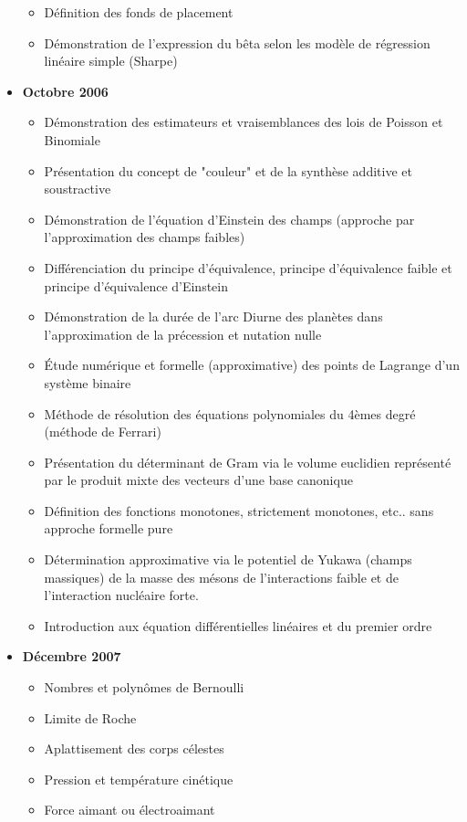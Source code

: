\begin{itemize}
\begin{itemize}[noitemsep]
				\item Définition des fonds de placement
				\item Démonstration de l'expression du bêta selon les modèle de régression linéaire simple (Sharpe)		
			\end{itemize}
		\item \textbf{Octobre 2006}
			\begin{itemize}[noitemsep]
				\item Démonstration des estimateurs et vraisemblances des lois de Poisson et Binomiale
				\item Présentation du concept de "couleur" et de la synthèse additive et soustractive
				\item Démonstration de l'équation d'Einstein des champs (approche par l'approximation des champs faibles)
				\item Différenciation du principe d'équivalence, principe d'équivalence faible et principe d'équivalence d'Einstein
				\item Démonstration de la durée de l'arc Diurne des planètes dans l'approximation de la précession et nutation nulle
				\item Étude numérique et formelle (approximative) des points de Lagrange d'un système binaire
				\item Méthode de résolution des équations polynomiales du 4èmes degré (méthode de Ferrari)
				\item Présentation du déterminant de Gram via le volume euclidien représenté par le produit mixte des vecteurs d'une base canonique
				\item Définition des fonctions monotones, strictement monotones, etc.. sans approche formelle pure
				\item Détermination approximative via le potentiel de Yukawa (champs massiques) de la masse des mésons de l'interactions faible et de l'interaction nucléaire forte.
				\item Introduction aux équation différentielles linéaires et du premier ordre
			\end{itemize}
		\item \textbf{Décembre 2007}
			\begin{itemize}[noitemsep]
				\item Nombres et polynômes de Bernoulli
				\item Limite de Roche
				\item Aplattisement des corps célestes
				\item Pression et température cinétique
				\item Force aimant ou électroaimant

\end{itemize}
\end{itemize}

